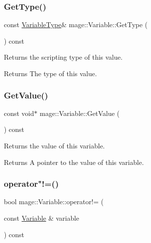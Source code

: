 \subsubsection{\texorpdfstring{Get\+Type()}{GetType()}}
{\footnotesize\ttfamily const \hyperlink{namespacemage_a530428e73bac0ba7fe84b29086a9e33a}{Variable\+Type}\& mage\+::\+Variable\+::\+Get\+Type (\begin{DoxyParamCaption}{ }\end{DoxyParamCaption}) const}

Returns the scripting type of this value.

\begin{DoxyReturn}{Returns}
The type of this value. 
\end{DoxyReturn}
\hypertarget{structmage_1_1_variable_a65ecc95bcdc26733394d3a32d3d698f1}{}\label{structmage_1_1_variable_a65ecc95bcdc26733394d3a32d3d698f1} 
\subsubsection{\texorpdfstring{Get\+Value()}{GetValue()}}
{\footnotesize\ttfamily const void$\ast$ mage\+::\+Variable\+::\+Get\+Value (\begin{DoxyParamCaption}{ }\end{DoxyParamCaption}) const}

Returns the value of this variable.

\begin{DoxyReturn}{Returns}
A pointer to the value of this variable. 
\end{DoxyReturn}
\hypertarget{structmage_1_1_variable_a7983cd74a25e3998abac8d89245d1fd9}{}\label{structmage_1_1_variable_a7983cd74a25e3998abac8d89245d1fd9} 
\subsubsection{\texorpdfstring{operator"!=()}{operator!=()}}
{\footnotesize\ttfamily bool mage\+::\+Variable\+::operator!= (\begin{DoxyParamCaption}\item[{const \hyperlink{structmage_1_1_variable}{Variable} \&}]{variable }\end{DoxyParamCaption}) const}

